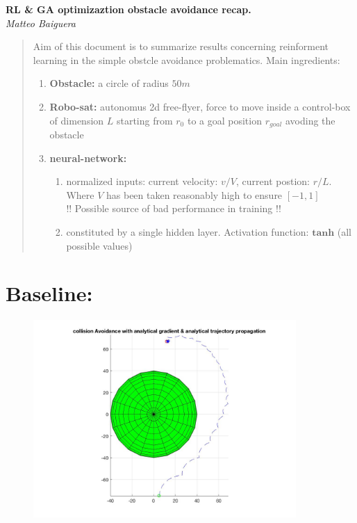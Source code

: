 \documentclass[a4paper,6pt]{article}
\theoremstyle{Definition}
\theoremstyle{Theorem}
\begin{document}
\begin{titlepage}
   \begin{center}
      \Large\textbf{ RL \& GA optimizaztion obstacle avoidance recap. }\\
      \large\textit{Matteo Baiguera}
   \end{center}
\end{titlepage}


\begin{abstract}
Aim of this document is to summarize results concerning reinforment learning in the simple obstcle avoidance problematics. Main ingredients:
\begin{enumerate}
\item{\textbf{Obstacle: } a circle of radius $50m$}
\item{\textbf{Robo-sat:} autonomus 2d free-flyer, force to move inside a control-box of dimension $L$  starting from $r_0$ to a goal position $r_{goal}$ avoding the obstacle  }
\item{\textbf{neural-network:} 
\begin{enumerate}
	\item{ normalized inputs: current velocity: $v/ V$, current postion: $r/L$. Where $V$ has been taken reasonably high to ensure $[-1,1]$ \\ !! Possible source of bad performance in training !! }
	\item{ constituted by a single hidden layer. Activation function: $\mathbf{tanh}$ (all possible values)}
\end{enumerate}

 }

\end{enumerate}
\end{abstract}

\section{Baseline: }
\begin{figure}[H]
 	\begin{center}
 		\includegraphics[width=10cm]{APF.jpg}
 		
 	\end{center}
 \end{figure}
\end{document}
